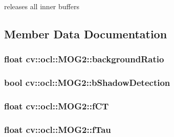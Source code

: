 releases all inner buffers 



\subsection{Member Data Documentation}
\hypertarget{classcv_1_1ocl_1_1MOG2_a6ce6183a92badc37d7be1572ceb95e91}{
\subsubsection[{background\-Ratio}]{\setlength{\rightskip}{0pt plus 5cm}float cv\-::ocl\-::\-M\-O\-G2\-::background\-Ratio}}\label{classcv_1_1ocl_1_1MOG2_a6ce6183a92badc37d7be1572ceb95e91}
\hypertarget{classcv_1_1ocl_1_1MOG2_acfef606ea1a73b3ff31527eebd29bc0f}{
\subsubsection[{b\-Shadow\-Detection}]{\setlength{\rightskip}{0pt plus 5cm}bool cv\-::ocl\-::\-M\-O\-G2\-::b\-Shadow\-Detection}}\label{classcv_1_1ocl_1_1MOG2_acfef606ea1a73b3ff31527eebd29bc0f}
\hypertarget{classcv_1_1ocl_1_1MOG2_a47f4b7400e781ff021dbaba79f84ea38}{
\subsubsection[{f\-C\-T}]{\setlength{\rightskip}{0pt plus 5cm}float cv\-::ocl\-::\-M\-O\-G2\-::f\-C\-T}}\label{classcv_1_1ocl_1_1MOG2_a47f4b7400e781ff021dbaba79f84ea38}
\hypertarget{classcv_1_1ocl_1_1MOG2_a29781e10eeabae3095ba624ecaea3c35}{
\subsubsection[{f\-Tau}]{\setlength{\rightskip}{0pt plus 5cm}float cv\-::ocl\-::\-M\-O\-G2\-::f\-Tau}}\label{classcv_1_1ocl_1_1MOG2_a29781e10eeabae3095ba624ecaea3c35}
